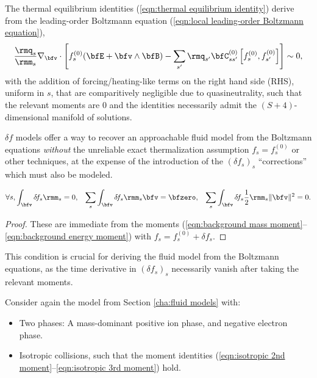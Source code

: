     The thermal equilibrium identities (\ref{eqn:thermal equilibrium identity}) derive from the leading-order Boltzmann equation (\ref{eqn:local leading-order Boltzmann equation}),
    \begin{equation}
        \frac{\rmq_{s}}{\rmm_{s}}\nabla_{\bfv}\cdot\left[f_{s}^{(0)}(\bfE + \bfv\wedge\bfB) - \sum_{s'}\rmq_{s'}\bfC_{ss'}^{(0)}\left[f_{s}^{(0)}, f_{s'}^{(0)}\right]\right]  \sim  0,
    \end{equation}
    with the addition of forcing/heating-like terms on the right hand side (RHS), uniform in $s$, that are comparitively negligible due to quasineutrality, such that the relevant moments are 0 and the identities necessarily admit the $(S + 4)$-dimensional manifold of solutions.

    $\delta\! f$ models offer a way to recover an approachable fluid model from the Boltzmann equations \emph{without} the unreliable exact thermalization assumption $f_{s}  =  f_{s}^{(0)}$ or other techniques, at the expense of the introduction of the $(\delta\! f_{s})_{s}$ ``corrections'' which must also be modeled.

    \line

    \begin{lemma}
        \begin{align}
            \forall s,          \int_{\bfv}\delta\! f_{s}\rmm_{s}                          =  0,  &&
                        \sum_{s}\int_{\bfv}\delta\! f_{s}\rmm_{s}\bfv                      =  \bfzero,  &&
                        \sum_{s}\int_{\bfv}\delta\! f_{s}\frac{1}{2}\rmm_{s}\|\bfv\|^{2}   =  0.
        \end{align}
    \end{lemma}
    \begin{proof}
        These are immediate from the moments (\ref{eqn:background mass moment}--\ref{eqn:background energy moment}) with $f_{s}  =  f_{s}^{(0)} + \delta\! f_{s}$.
    \end{proof}

    This condition is crucial for deriving the fluid model from the Boltzmann equations, as the time derivative in $(\delta\! f_{s})_{s}$ necessarily vanish after taking the relevant moments.

    \line
    
    Consider again the model from Section \ref{cha:fluid models} with:
    \begin{itemize}
        \item  Two phases: A mass-dominant positive ion phase, and negative electron phase.
        \item  Isotropic collisions, such that the moment identities (\ref{eqn:isotropic 2nd moment}--\ref{eqn:isotropic 3rd moment}) hold.
    \end{itemize}

